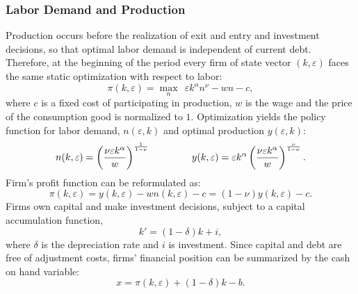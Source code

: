 \documentclass[12pt]{article}
\begin{document}
\subsubsection{Labor Demand and Production \label{sec:labor demand}}
Production occurs before the realization of exit and entry and investment decisions, so that optimal labor demand is independent of current debt. Therefore, at the beginning of the period every firm of state vector $(k,\varepsilon)$ faces the same static optimization with respect to labor: 
$$ \pi(k,\varepsilon) = \max_{n} \ \  \varepsilon k^{\alpha}n^{\nu} - wn - c,$$
where $c$ is a fixed cost of participating in production, $w$ is the wage and the price of the consumption good is normalized to $1$. Optimization yields the policy function for labor demand, $n(\varepsilon,k)$ and optimal production $y(\varepsilon,k)$: 
\begin{equation} \label{eq:opt_emp_prod}
n(k,\varepsilon) = \left( \dfrac{ \nu \varepsilon k^\alpha}{w} \right)^{\frac{1}{1-\nu}} \hspace{15mm}
y(k,\varepsilon) = \varepsilon k^{\alpha} \left( \dfrac{\nu \varepsilon k^\alpha}{w} \right)^{\frac{\nu}{1-\nu}}.
\end{equation}  
Firm's profit function can be reformulated as: 
\begin{equation} \label{eq:profit}
\pi(k,\varepsilon) = y(k,\varepsilon) - wn(k,\varepsilon) - c = (1-\nu) y(k,\varepsilon) - c.
\end{equation} 
Firms own capital and make investment decisions, subject to a capital accumulation function,
\begin{equation} \label{eq:capital}
k' = (1-\delta)k + i,
\end{equation} 
where $\delta$ is the depreciation rate and $i$ is investment. Since capital and debt are free of adjustment costs, firms' financial position can be summarized by the cash on hand variable:
\begin{equation} \label{eq:cash on hand}
    x = \pi(k,\varepsilon) + (1-\delta)k - b.
\end{equation}
\end{document}
